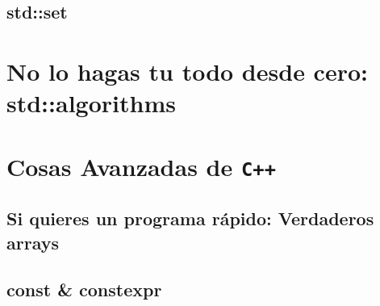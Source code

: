\documentclass[12pt, fleqn]{report}                             %
\theoremstyle{break}                                            %
\newcommand{\textCode}[1]  { \texttt{#1} }                      %
\newcommand \Cpp  {\textCode{C++} }                               %
\begin{document}
        \section{std::set}

    \clearpage
    \chapter{No lo hagas tu todo desde cero: std::algorithms}



    \clearpage
    \chapter{Cosas Avanzadas de \Cpp}

        \clearpage
        \section{Si quieres un programa rápido: Verdaderos arrays}  


        \clearpage
        \section{const \& constexpr}

\end{document}

